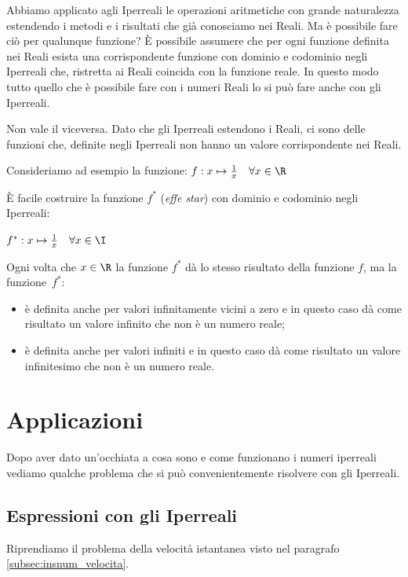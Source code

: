 Abbiamo applicato agli Iperreali le operazioni aritmetiche con grande 
naturalezza estendendo i metodi e i risultati che già conosciamo nei Reali. 
Ma è possibile fare ciò per qualunque funzione? 
È possibile assumere che per ogni funzione definita nei Reali esista una 
corrispondente funzione con dominio e codominio negli Iperreali che, ristretta 
ai Reali coincida con la funzione reale.
In questo modo tutto quello che è possibile fare con i numeri Reali lo si può 
fare anche con gli Iperreali.

\begin{osservazione}
 Non vale il viceversa. Dato che gli Iperreali estendono i Reali, ci sono delle 
funzioni che, definite negli Iperreali non hanno un valore corrispondente nei 
Reali.

\begin{esempio}
 Consideriamo ad esempio la funzione: 
$f: x \mapsto \frac{1}{x} \quad \forall x \in \R$

È facile costruire la funzione $f^*$ (\emph{effe star}) con dominio e codominio 
negli Iperreali:

$f^*: x \mapsto \frac{1}{x} \quad \forall x \in \I$

Ogni volta che $x \in \R$ la funzione $f^*$ dà lo stesso risultato della 
funzione $f$, ma la funzione~$f^*$:
\begin{itemize}
 \item 
è definita anche per valori infinitamente vicini a zero e 
in questo caso dà come risultato un valore infinito che non è un numero reale;
 \item 
è definita anche per valori infiniti e
in questo caso dà come risultato un valore infinitesimo che non è un numero 
reale. 
\end{itemize}
\end{esempio}
\end{osservazione}

\section{Applicazioni}
\label{sec:insnum_applicazioni}

Dopo aver dato un'occhiata a cosa sono e come funzionano i numeri iperreali 
vediamo qualche problema che si può convenientemente risolvere con gli 
Iperreali.

\subsection{Espressioni con gli Iperreali}
\label{subsec:insnum_espressioni}
Riprendiamo il problema della velocità istantanea visto nel paragrafo 
\ref{subsec:insnum_velocita}.

